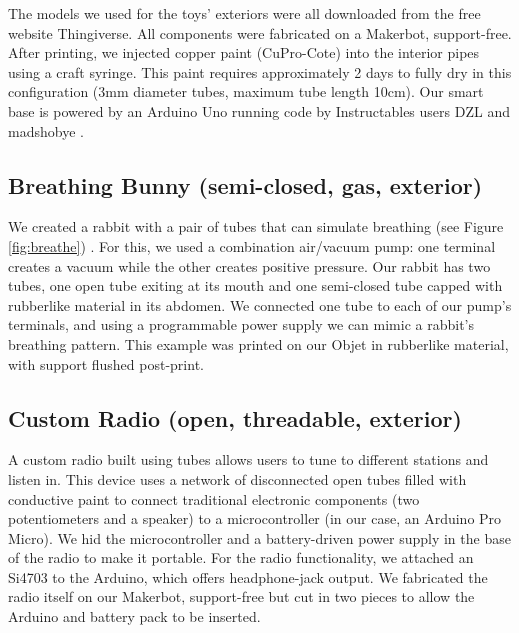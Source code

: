 The models we used for the toys' exteriors were all downloaded from the free website Thingiverse.  All components were fabricated on a Makerbot, support-free.  After printing, we injected copper paint (CuPro-Cote) into the interior pipes using a craft syringe.  This paint requires approximately 2 days to fully dry in this configuration (3mm diameter tubes, maximum tube length 10cm).  Our smart base is powered by an Arduino Uno running code by Instructables users DZL and madshobye .

\subsection{Breathing Bunny (semi-closed, gas, exterior)}

We created a rabbit with a pair of tubes that can simulate breathing (see Figure \ref{fig:breathe}) .  For this, we used a combination air/vacuum pump: one terminal creates a vacuum while the other creates positive pressure.  Our rabbit has two tubes, one open tube exiting at its mouth and one semi-closed tube capped with rubberlike material in its abdomen.  We connected one tube to each of our pump's terminals, and using a programmable power supply we can mimic a rabbit's breathing pattern.  This example was printed on our Objet in rubberlike material, with support flushed post-print. 

\subsection{Custom Radio (open, threadable, exterior)}

A custom radio built using tubes allows users to tune to different stations and listen in.  This device uses a network of disconnected open tubes filled with conductive paint to connect traditional electronic components (two potentiometers and a speaker) to a microcontroller (in our case, an Arduino Pro Micro).  We hid the microcontroller and a battery-driven power supply in the base of the radio to make it portable.  For the radio functionality, we attached an Si4703 to the Arduino, which offers headphone-jack output.  We fabricated the radio itself on our Makerbot, support-free but cut in two pieces to allow the Arduino and battery pack to be inserted.

